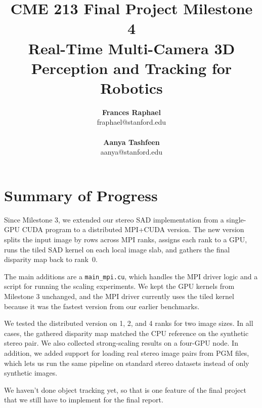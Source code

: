 \documentclass[11pt]{article}
\begin{document}
\title{CME 213 Final Project Milestone 4\\
Real-Time Multi-Camera 3D Perception and Tracking for Robotics}

\author{%
\begin{center}
\begin{minipage}[t]{0.46\textwidth}\centering
\textbf{Frances Raphael}\\
{\ttfamily fraphael@stanford.edu}\\
\end{minipage}\hfill
\begin{minipage}[t]{0.46\textwidth}\centering
\textbf{Aanya Tashfeen}\\
{\ttfamily aanya@stanford.edu}\\
\end{minipage}
\end{center}
}
\maketitle

\section{Summary of Progress}

Since Milestone 3, we extended our stereo SAD implementation from a single-GPU CUDA
program to a distributed MPI+CUDA version. The new version splits the input image by
rows across MPI ranks, assigns each rank to a GPU, runs the tiled SAD kernel on each
local image slab, and gathers the final disparity map back to rank~0.

The main additions are a \texttt{main\_mpi.cu}, which handles the MPI driver logic and a script for running the scaling experiments. We kept the GPU kernels from Milestone 3
unchanged, and the MPI driver currently uses the tiled kernel because it was the
fastest version from our earlier benchmarks.

We tested the distributed version on 1, 2, and 4 ranks for two image sizes. In all
cases, the gathered disparity map matched the CPU reference on the synthetic stereo
pair. We also collected strong-scaling results on a four-GPU node. In addition, we added support for loading real stereo image pairs from
PGM files, which lets us run the same pipeline on standard stereo datasets instead
of only synthetic images.

We haven't done object tracking yet, so that is one feature of the final project that we still have to implement for the final
report.
\end{document}
